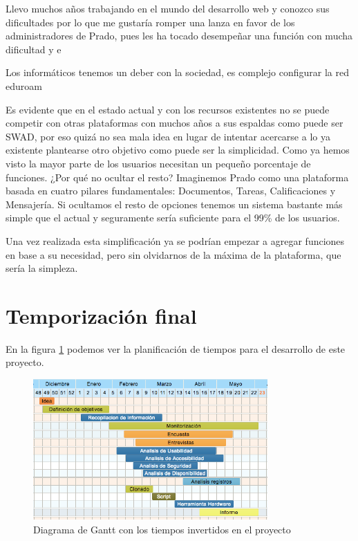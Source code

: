 Llevo muchos años trabajando en el mundo del desarrollo web y conozco sus dificultades por lo que me gustaría romper una lanza en favor de los administradores de Prado, pues  les ha tocado desempeñar una función con mucha dificultad y e


Los informáticos tenemos un deber con la sociedad, es complejo configurar la red eduroam


Es evidente que en el estado actual y con los recursos existentes no se puede competir con otras plataformas con muchos años a sus espaldas como puede ser SWAD, por eso quizá no sea mala idea en lugar de intentar acercarse a lo ya existente plantearse otro objetivo como puede ser la simplicidad. Como ya hemos visto la mayor parte de los usuarios necesitan un pequeño porcentaje de funciones. ¿Por qué no ocultar el resto? Imaginemos Prado como una plataforma basada en cuatro pilares fundamentales: Documentos, Tareas, Calificaciones y Mensajería. Si ocultamos el resto de opciones tenemos un sistema bastante más simple que el actual y seguramente sería suficiente para el 99\% de los usuarios.

Una vez realizada esta simplificación ya se podrían empezar a agregar funciones en base a su necesidad, pero sin olvidarnos de la máxima de la plataforma, que sería la simpleza. 


\section{Temporización final}

En la figura \ref{fig:temporizacion2} podemos ver la planificación de tiempos para el desarrollo de este proyecto. 

\begin{figure}[H]
\centering
\includegraphics[width=0.8\textwidth]{../screenshots/temporizacion2}
\caption{Diagrama de Gantt con los tiempos invertidos en el proyecto}
\label{fig:temporizacion2}
\end{figure}

